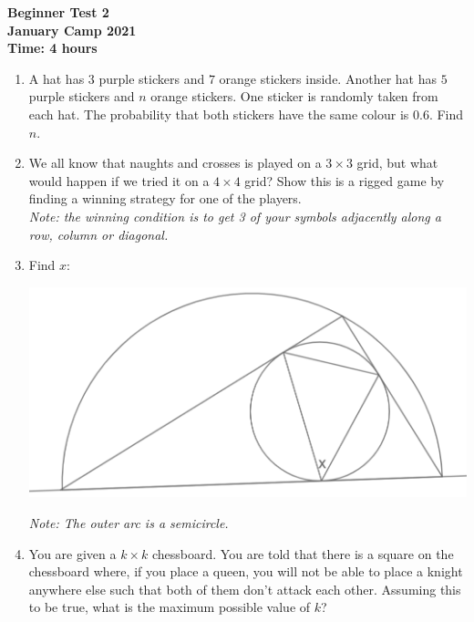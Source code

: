 \documentclass{article}
\begin{document}
\thispagestyle{empty}

\begin{center}
  \textbf{\Large Beginner Test 2}
  \\ \vspace{1em}
  \textbf{\large January Camp 2021}
  \\ \vspace{1em}
  \textbf{\large Time: 4 hours}
\end{center}

\vspace{24pt}

\begin{enumerate}[1.]


\item %
A hat has $3$ purple stickers and $7$ orange stickers inside. Another hat has $5$ purple stickers and $n$ orange stickers. One sticker is randomly taken from each hat. The probability that both stickers have the same colour is $0.6$. Find $n$.


\item %
We all know that naughts and crosses is played on a $3\times 3$ grid, but what would happen if we tried it on a $4\times 4$ grid? Show this is a rigged game by finding a winning strategy for one of the players.\\
\textit{Note: the winning condition is to get 3 of your symbols adjacently along a row, column or diagonal.}


\item %
Find $x$:
\begin{center}
\includegraphics[scale=0.4]{angle_diagram.png}
\end{center}
\textit{Note: The outer arc is a semicircle.}


\item %
You are given a ${k\times k}$ chessboard. You are told that there is a square on the chessboard where, if you place a queen, you will not be able to place a knight anywhere else such that both of them don't attack each other. Assuming this to be true, what is the maximum possible value of $k$?



\end{enumerate}
\end{document}
